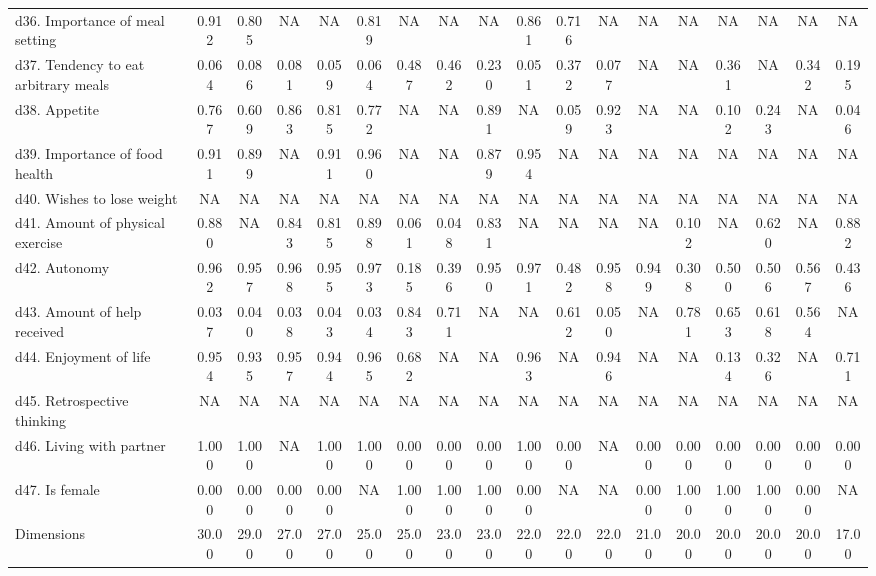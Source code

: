 \begin{table}
\begin{tabulary}{\linewidth}{LCCCCCCCCCCCCCCCCC}
d36. Importance of meal setting & 0.912 & 0.805 & NA    & NA    & 0.819 & NA    & NA    & NA    & 0.861 & 0.716 & NA    & NA    & NA    & NA    & NA    & NA    & NA \\
d37. Tendency to eat arbitrary meals & 0.064 & 0.086 & 0.081 & 0.059 & 0.064 & 0.487 & 0.462 & 0.230 & 0.051 & 0.372 & 0.077 & NA    & NA    & 0.361 & NA    & 0.342 & 0.195 \\
d38. Appetite & 0.767 & 0.609 & 0.863 & 0.815 & 0.772 & NA    & NA    & 0.891 & NA    & 0.059 & 0.923 & NA    & NA    & 0.102 & 0.243 & NA    & 0.046 \\
d39. Importance of food health & 0.911 & 0.899 & NA    & 0.911 & 0.960 & NA    & NA    & 0.879 & 0.954 & NA    & NA    & NA    & NA    & NA    & NA    & NA    & NA \\
d40. Wishes to lose weight & NA    & NA    & NA    & NA    & NA    & NA    & NA    & NA    & NA    & NA    & NA    & NA    & NA    & NA    & NA    & NA    & NA \\
d41. Amount of physical exercise & 0.880 & NA    & 0.843 & 0.815 & 0.898 & 0.061 & 0.048 & 0.831 & NA    & NA    & NA    & NA    & 0.102 & NA    & 0.620 & NA    & 0.882 \\
d42. Autonomy & 0.962 & 0.957 & 0.968 & 0.955 & 0.973 & 0.185 & 0.396 & 0.950 & 0.971 & 0.482 & 0.958 & 0.949 & 0.308 & 0.500 & 0.506 & 0.567 & 0.436 \\
d43. Amount of help received & 0.037 & 0.040 & 0.038 & 0.043 & 0.034 & 0.843 & 0.711 & NA    & NA    & 0.612 & 0.050 & NA    & 0.781 & 0.653 & 0.618 & 0.564 & NA \\
d44. Enjoyment of life & 0.954 & 0.935 & 0.957 & 0.944 & 0.965 & 0.682 & NA    & NA    & 0.963 & NA    & 0.946 & NA    & NA    & 0.134 & 0.326 & NA    & 0.711 \\
d45. Retrospective thinking & NA    & NA    & NA    & NA    & NA    & NA    & NA    & NA    & NA    & NA    & NA    & NA    & NA    & NA    & NA    & NA    & NA \\
d46. Living with partner & 1.000 & 1.000 & NA    & 1.000 & 1.000 & 0.000 & 0.000 & 0.000 & 1.000 & 0.000 & NA    & 0.000 & 0.000 & 0.000 & 0.000 & 0.000 & 0.000 \\
d47. Is female & 0.000 & 0.000 & 0.000 & 0.000 & NA    & 1.000 & 1.000 & 1.000 & 0.000 & NA    & NA    & 0.000 & 1.000 & 1.000 & 1.000 & 0.000 & NA \\
\bottomrule Dimensions & 30.00 & 29.00 & 27.00 & 27.00 & 25.00 & 25.00 & 23.00 & 23.00 & 22.00 & 22.00 & 22.00 & 21.00 & 20.00 & 20.00 & 20.00 & 20.00 & 17.00 \\
\end{tabulary}%
\end{table}%


